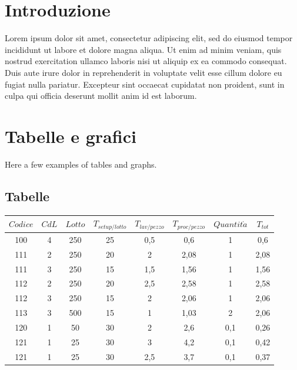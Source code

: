 \documentclass{FR16}
\begin{document}
\maketitle

\tableofcontents
\newpage
\section{Introduzione}
Lorem ipsum dolor sit amet, consectetur adipiscing elit, sed do eiusmod tempor incididunt ut labore et dolore magna aliqua. Ut enim ad minim veniam, quis nostrud exercitation ullamco laboris nisi ut aliquip ex ea commodo consequat. Duis aute irure dolor in reprehenderit in voluptate velit esse cillum dolore eu fugiat nulla pariatur. Excepteur sint occaecat cupidatat non proident, sunt in culpa qui officia deserunt mollit anim id est laborum.
\newpage

\section{Tabelle e grafici}
Here a few examples of tables and graphs.
\subsection{Tabelle}
\begin{center}
\begin{tabular}{c c c c c c c c}
\arrayrulecolor{Azzurro}
\hline
{\bfseries $Codice$} & {\bfseries $CdL$} & {\bfseries $Lotto$} & {\bfseries $T_{setup/lotto}$} & {\bfseries $T_{lav/pezzo}$} & {\bfseries $T_{proc/pezzo}$} & {\bfseries$Quantit\grave{a}$} & {\bfseries $T_{tot}$}\\
\hline
100 & 4 & 250 & 25 & 0,5 & 0,6 & 1 & 0,6\\
111 & 2 & 250 & 20 & 2 & 2,08 & 1 & 2,08 \\
111 & 3 & 250 & 15 & 1,5 & 1,56 & 1 & 1,56 \\
112 & 2 & 250 & 20 & 2,5 & 2,58 & 1 & 2,58 \\
112 & 3 & 250 & 15 & 2 & 2,06 & 1 & 2,06\\
113 & 3 & 500 & 15 & 1 & 1,03 & 2 & 2,06\\
120 & 1 & 50 & 30 & 2 & 2,6 & 0,1 & 0,26\\
121 & 1 & 25 & 30 & 3 & 4,2 & 0,1 & 0,42 \\
121 & 1 & 25 & 30 & 2,5 & 3,7 & 0,1 & 0,37 \\
\hline
\end{tabular}
\end{center}
\end{document}
